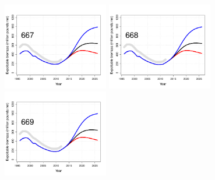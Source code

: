 \begin{figure}[htbp]
	\centering
		\includegraphics[height=1.5in]{../FIGURES/SIZELIMIT/fig_32_DI_EBio.pdf}
		\includegraphics[height=1.5in]{../FIGURES/SIZELIMIT/fig_29_DI_EBio.pdf}
		\includegraphics[height=1.5in]{../FIGURES/SIZELIMIT/fig_26_DI_EBio.pdf}
		

\end{figure}
